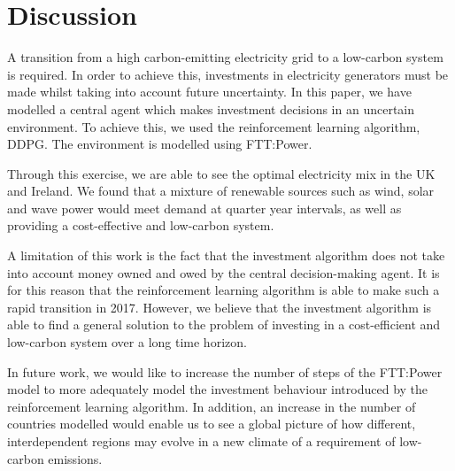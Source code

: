 \documentclass{article}
\begin{document}


\section{Discussion}

A transition from a high carbon-emitting electricity grid to a low-carbon system is required. In order to achieve this, investments in electricity generators must be made whilst taking into account future uncertainty. In this paper, we have modelled a central agent which makes investment decisions in an uncertain environment. To achieve this, we used the reinforcement learning algorithm, DDPG. The environment is modelled using FTT:Power.

Through this exercise, we are able to see the optimal electricity mix in the UK and Ireland. We found that a mixture of renewable sources such as wind, solar and wave power would meet demand at quarter year intervals, as well as providing a cost-effective and low-carbon system.

A limitation of this work is the fact that the investment algorithm does not take into account money owned and owed by the central decision-making agent. It is for this reason that the reinforcement learning algorithm is able to make such a rapid transition in 2017. However, we believe that the investment algorithm is able to find a general solution to the problem of investing in a cost-efficient and low-carbon system over a long time horizon.

In future work, we would like to increase the number of steps of the FTT:Power model to more adequately model the investment behaviour introduced by the reinforcement learning algorithm. In addition, an increase in the number of countries modelled would enable us to see a global picture of how different, interdependent regions may evolve in a new climate of a requirement of low-carbon emissions.










\end{document}
